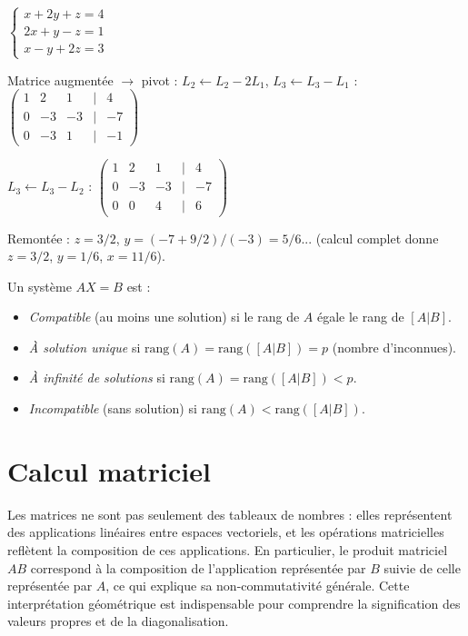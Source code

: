 \documentclass[11pt,a4paper,twoside]{book}
\begin{document}
\begin{exemplebox}
$\begin{cases} x+2y+z=4 \\ 2x+y-z=1 \\ x-y+2z=3 \end{cases}$

Matrice augmentée $\to$ pivot :
$L_2 \leftarrow L_2-2L_1$, $L_3 \leftarrow L_3-L_1$ :
$\begin{pmatrix}1&2&1&|&4\\0&-3&-3&|&-7\\0&-3&1&|&-1\end{pmatrix}$

$L_3 \leftarrow L_3-L_2$ :
$\begin{pmatrix}1&2&1&|&4\\0&-3&-3&|&-7\\0&0&4&|&6\end{pmatrix}$

Remontée : $z=3/2$, $y=(-7+9/2)/(-3)=5/6$... (calcul complet donne $z=3/2$, $y=1/6$, $x=11/6$).
\end{exemplebox}

\begin{theoremebox}
Un système $AX=B$ est :
\begin{itemize}
  \item \emph{Compatible} (au moins une solution) si le rang de $A$ égale le rang de $[A|B]$.
  \item \emph{À solution unique} si $\mathrm{rang}(A)=\mathrm{rang}([A|B])=p$ (nombre d'inconnues).
  \item \emph{À infinité de solutions} si $\mathrm{rang}(A)=\mathrm{rang}([A|B])<p$.
  \item \emph{Incompatible} (sans solution) si $\mathrm{rang}(A)<\mathrm{rang}([A|B])$.
\end{itemize}
\end{theoremebox}

\section{Calcul matriciel}

Les matrices ne sont pas seulement des tableaux de nombres : elles représentent des applications linéaires entre espaces vectoriels, et les opérations matricielles reflètent la composition de ces applications. En particulier, le produit matriciel $AB$ correspond à la composition de l'application représentée par $B$ suivie de celle représentée par $A$, ce qui explique sa non-commutativité générale. Cette interprétation géométrique est indispensable pour comprendre la signification des valeurs propres et de la diagonalisation.
\end{document}

